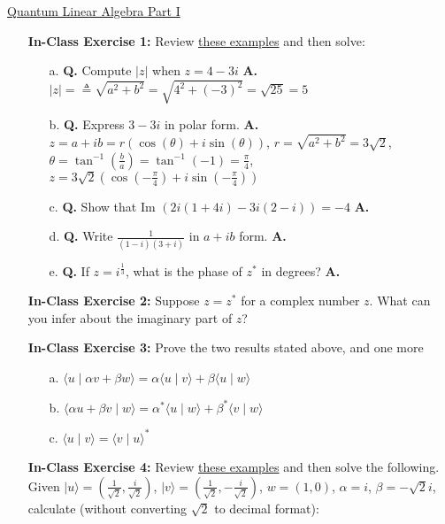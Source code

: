 \documentclass[main.tex]{subfiles}
\begin{document}
\href{https://www2.seas.gwu.edu/~simhaweb/quantum/modules/module2/module2.html}{Quantum Linear Algebra Part I}

\begin{enumerate}

\item[] \textbf{In-Class Exercise 1:} Review \href{https://www2.seas.gwu.edu/~simhaweb/quantum/modules/module2/problems2.html#complex}{these examples} and then solve:

    \begin{enumerate}
        \item[a.] \textbf{Q.} Compute $|z|$ when $z = 4-3i$ \textbf{A.} $|z| = \triangleq \sqrt{a^{2}+b^{2}} = \sqrt{4^2 + (-3)^2} = \sqrt{25} = 5$ 
        \item[b.] \textbf{Q.} Express $3-3 i$ in polar form. \textbf{A.} $z=a+ib=r(\cos (\theta)+i \sin (\theta))$, $r=\sqrt{a^2 + b^2} = 3\sqrt{2}$, $\theta = \tan^{-1}(\frac{b}{a}) = \tan^{-1}(-1) = \frac{\pi}{4}$, $z=3\sqrt{2}(\cos (-\frac{\pi}{4})+i \sin (-\frac{\pi}{4}))$  
        \item[c.] \textbf{Q.} Show that Im $(2 i(1+4 i)-3 i(2-i))=-4$ \textbf{A.}
        \item[d.] \textbf{Q.} Write $\frac{1}{(1-i)(3+i)}$ in $a+ib$ form. \textbf{A.}
        \item[e.] \textbf{Q.} If $z=i^{\frac{1}{3}}$, what is the phase of $z^{*}$ in degrees? \textbf{A.}
    \end{enumerate}

\item[] \textbf{In-Class Exercise 2:} Suppose $z=z^{*}$ for a complex number $z$. What can you infer about the imaginary part of $z$?

\item[] \textbf{In-Class Exercise 3:} Prove the two results stated above, and one more

    \begin{enumerate}
        \item[a.] $\langle u \mid \alpha v+\beta w\rangle=\alpha\langle u \mid v\rangle+\beta\langle u \mid w\rangle$
        \item[b.] $\langle\alpha u+\beta v \mid w\rangle=\alpha^{*}\langle u \mid w\rangle+\beta^{*}\langle v \mid w\rangle$
        \item[c.] $\langle u \mid v\rangle=\langle v \mid u\rangle^{*}$
    \end{enumerate}

\item[] \textbf{In-Class Exercise 4:} Review \href{https://www2.seas.gwu.edu/~simhaweb/quantum/modules/module2/problems2.html#vectors}{these examples} and then solve the following. Given $|u\rangle=\left(\frac{1}{\sqrt{2}}, \frac{i}{\sqrt{2}}\right)$, $|v\rangle=\left(\frac{1}{\sqrt{2}}, -\frac{i}{\sqrt{2}}\right)$, $w=(1,0)$, $\alpha=i$, $\beta=-\sqrt{2}i$, calculate (without converting $\sqrt{2}$ to decimal format):


\end{enumerate}
\end{document}
